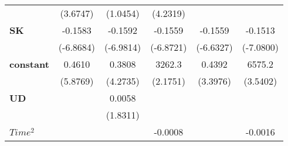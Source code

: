 \documentclass{article}
\begin{document}
\begin{table}[!htbp]
{\begin{tabular}{lccccc}
\textbf{ }                     &     (3.6747)    &        (1.0454)       &     (4.2319)     &                   &                        \\
\textbf{SK}            &     -0.1583     &        -0.1592        &     -0.1559      &      -0.1559      &        -0.1513         \\
\textbf{ }                     &    (-6.8684)    &       (-6.9814)       &    (-6.8721)     &     (-6.6327)     &       (-7.0800)        \\
\textbf{constant}                 &      0.4610     &         0.3808        &      3262.3      &       0.4392      &         6575.2         \\
\textbf{ }                     &     (5.8769)    &        (4.2735)       &     (2.1751)     &      (3.3976)     &        (3.5402)        \\
\textbf{UD}                    &                 &         0.0058        &                  &                   &                        \\
\textbf{ }                     &                 &        (1.8311)       &                  &                   &                        \\
\textbf{$Time^2$}             &                 &                       &     -0.0008      &                   &        -0.0016         \\
\bottomrule
\end{tabular}}
\end{table}
\end{document}
